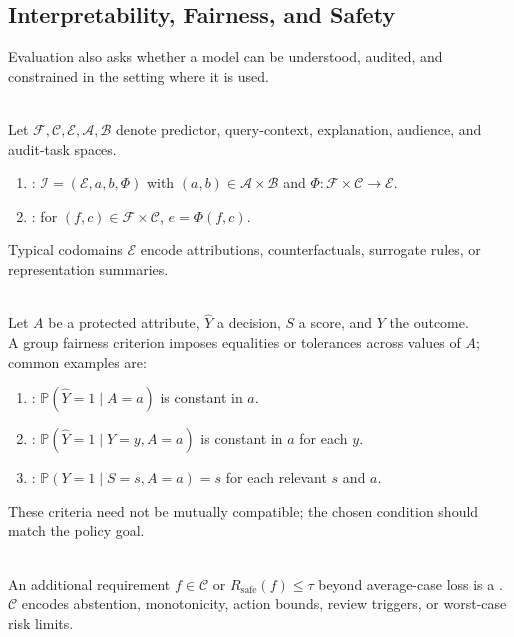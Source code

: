\subsection{Interpretability, Fairness, and Safety}

Evaluation also asks whether a model can be understood, audited, and constrained in the setting where it is used.

\begin{definition} \label{def:sl-interpretability} \\
Let $\mathcal{F},\mathcal{C},\mathcal{E},\mathcal{A},\mathcal{B}$ denote predictor, query-context, explanation, audience, and audit-task spaces.
\begin{enumerate}[label=(\roman*)]
\setlength{\itemsep}{0pt}
\item {}: $\mathcal{I}=(\mathcal{E},a,b,\Phi)$ with $(a,b)\in\mathcal{A}\times\mathcal{B}$ and $\Phi:\mathcal{F}\times\mathcal{C}\to\mathcal{E}$.
\item {}: for $(f,c)\in\mathcal{F}\times\mathcal{C}$, $e=\Phi(f,c)$.
\end{enumerate}
Typical codomains $\mathcal{E}$ encode attributions, counterfactuals, surrogate rules, or representation summaries.
\end{definition}

\begin{definition} \label{def:sl-fairness-criteria} \\
Let $A$ be a protected attribute, $\widehat Y$ a decision, $S$ a score, and $Y$ the outcome.\\
A group fairness criterion imposes equalities or tolerances across values of $A$; common examples are:
\begin{enumerate}[label=(\roman*)]
\setlength{\itemsep}{0pt}
\item {}: $\mathbb{P}(\widehat Y=1\mid A=a)$ is constant in $a$.
\item {}: $\mathbb{P}(\widehat Y=1\mid Y=y,A=a)$ is constant in $a$ for each $y$.
\item {}: $\mathbb{P}(Y=1\mid S=s,A=a)=s$ for each relevant $s$ and $a$.
\end{enumerate}
These criteria need not be mutually compatible; the chosen condition should match the policy goal.
\end{definition}

\begin{definition} \label{def:sl-safety-constraint} \\
An additional requirement $f\in\mathcal{C}$ or $R_{\mathrm{safe}}(f)\le\tau$ beyond average-case loss is a .\\
$\mathcal{C}$ encodes abstention, monotonicity, action bounds, review triggers, or worst-case risk limits.
\end{definition}

